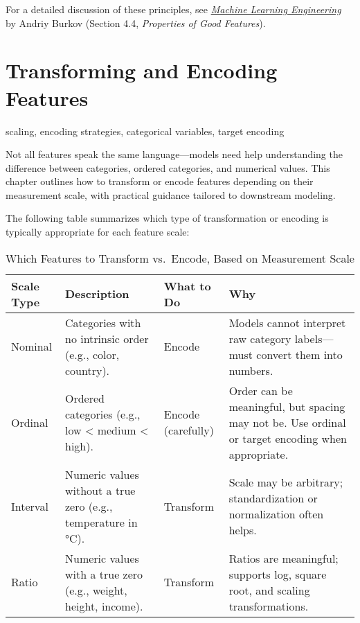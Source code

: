 \documentclass[12pt,openany]{book}
\begin{document}
For a detailed discussion of these principles, see \href{https://www.amazon.it/Machine-Learning-Engineering-Andriy-Burkov/dp/1999579577}{\textit{Machine Learning Engineering}} by Andriy Burkov (Section 4.4, \textit{Properties of Good Features}).



\section{Transforming and Encoding Features}

\begin{keywordsbox}
scaling, encoding strategies, categorical variables, target encoding \end{keywordsbox}

Not all features speak the same language—models need help understanding the difference between categories, ordered categories, and numerical values. This chapter outlines how to transform or encode features depending on their measurement scale, with practical guidance tailored to downstream modeling.
\newline

The following table summarizes which type of transformation or encoding is typically appropriate for each feature scale:

\begin{table}[H]
\centering
\caption*{Which Features to Transform vs.\ Encode, Based on Measurement Scale}
\vspace{0.5em}
\renewcommand{\arraystretch}{1.4} %
\begin{tabular}{|l|p{3.8cm}|p{3cm}|p{5.2cm}|}
\hline
\textbf{Scale Type} & \textbf{Description} & \textbf{What to Do} & \textbf{Why} \\
\hline
Nominal & Categories with no intrinsic order (e.g., color, country). & Encode & Models cannot interpret raw category labels—must convert them into numbers. \\
\hline
Ordinal & Ordered categories (e.g., low < medium < high). & Encode (carefully) & Order can be meaningful, but spacing may not be. Use ordinal or target encoding when appropriate. \\
\hline
Interval & Numeric values without a true zero (e.g., temperature in °C). & Transform & Scale may be arbitrary; standardization or normalization often helps. \\
\hline
Ratio & Numeric values with a true zero (e.g., weight, height, income). & Transform & Ratios are meaningful; supports log, square root, and scaling transformations. \\
\hline
\end{tabular}
\renewcommand{\arraystretch}{1.0} %
\end{table}
\end{document}
